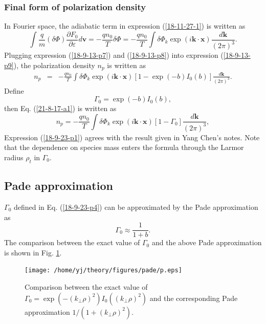 \documentclass{llncs}
\begin{document}
\subsubsection{Final form of polarization density}

In Fourier space, the adiabatic term in expression (\ref{18-11-27-1}) is
written as
\begin{equation}
  \label{18-9-13-p8} \int \frac{q}{m} (\delta \Phi) \frac{\partial
  F_0}{\partial \varepsilon} d\mathbf{v}= - \frac{q n_0}{T} \delta \Phi = -
  \frac{q n_0}{T}  \int \delta \Phi_k \exp (i\mathbf{k} \cdot \mathbf{x})
  \frac{d\mathbf{k}}{(2 \pi)^3} .
\end{equation}
Plugging expression (\ref{18-9-13-p7}) and (\ref{18-9-13-p8}) into expression
(\ref{18-9-13-p9}), the polarization density $n_p$ is written as
\begin{eqnarray}
  n_p & = & - \frac{q n_0}{T} \int \delta \Phi_k \exp (i\mathbf{k} \cdot
  \mathbf{x}) [1 - \exp (- b) I_0 (b)] \frac{d\mathbf{k}}{(2 \pi)^3} . 
  \label{21-8-17-a1}
\end{eqnarray}
Define
\begin{equation}
  \label{18-9-23-p4} \Gamma_0 = \exp (- b) I_0 (b),
\end{equation}
then Eq. (\ref{21-8-17-a1}) is written as
\begin{equation}
  \label{18-9-23-p1} n_p = - \frac{q n_0}{T} \int \delta \Phi_k \exp
  (i\mathbf{k} \cdot \mathbf{x}) [1 - \Gamma_0] \frac{d\mathbf{k}}{(2 \pi)^3},
\end{equation}
Expression (\ref{18-9-23-p1}) agrees with the result given in Yang Chen's
notes. Note that the dependence on species mass enters the formula through the
Larmor radius $\rho_t$ in $\Gamma_0$.

\subsection{Pade approximation}

$\Gamma_0$ defined in Eq. (\ref{18-9-23-p4}) can be approximated by the Pade
approximation as
\begin{equation}
  \label{18-10-23-p1} \Gamma_0 \approx \frac{1}{1 + b} .
\end{equation}
The comparison between the exact value of $\Gamma_0$ and the above Pade
approximation is shown in Fig. \ref{18-9-23-e1}.

\begin{figure}[h]
  \texttt{[image: /home/yj/theory/figures/pade/p.eps]}
  \caption{\label{18-9-23-e1}Comparison between the exact value of $\Gamma_0 =
  \exp (- (k_{\perp} \rho)^2) I_0 ((k_{\perp} \rho)^2)$ and the corresponding
  Pade approximation $1 / (1 + (k_{\perp} \rho)^2)$.}
\end{figure}
\end{document}
